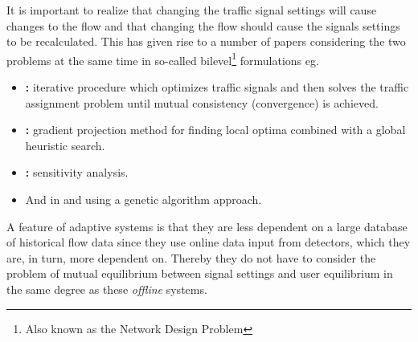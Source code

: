 It is important to realize that changing the traffic signal settings will cause changes to the flow and that changing the flow should cause the signals settings to be recalculated. This has given rise to a number of papers considering the two problems at the same time in so-called bilevel\footnote{Also known as the Network Design Problem} formulations eg. 
\begin{itemize}
\item \textbf{\cite{mc}:} iterative procedure which optimizes traffic signals and then solves the traffic assignment problem until mutual consistency (convergence) is achieved.
\item \textbf{\cite{34}:} gradient projection method for finding local optima combined with a global heuristic search.
\item \textbf{\cite{20}:} sensitivity analysis.
\item And in \textbf{\cite{2}} and \textbf{\cite{27}} using a genetic algorithm approach.
\end{itemize}

A feature of adaptive systems is that they are less dependent on a large database of historical flow data since they use online data input from detectors, which they are, in turn, more dependent on. Thereby they do not have to consider the problem of mutual equilibrium between signal settings and user equilibrium in the same degree as these \textit{offline} systems.